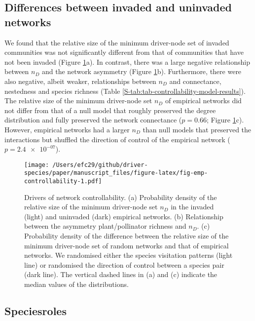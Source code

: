\documentclass[a4paper]{artikel1}
\theoremstyle{definition}
\theoremstyle{definition}
\theoremstyle{definition}
\theoremstyle{remark}
\providecommand{\DIFaddtex}[1]{{\protect\color{blue}\uwave{#1}}} %
\providecommand{\DIFaddbegin}{} %
\providecommand{\DIFaddend}{} %
\providecommand{\DIFadd}[1]{\texorpdfstring{\DIFaddtex{#1}}{#1}} %
\begin{document}
\subsection{Differences between invaded and uninvaded
networks}\label{differences-between-invaded-and-uninvaded-networks-1}

We found that the relative size of the minimum driver-node set of
invaded communities was not significantly different from that of
communities that have not been invaded (Figure
\ref{fig:fig-emp-controllability}a). In contrast, there was a large
negative relationship between \(n_D\) and the network asymmetry (Figure
\ref{fig:fig-emp-controllability}b). Furthermore, there were also
negative, albeit weaker, relationships between \(n_D\) and connectance,
nestedness and species richness (Table
\ref{S-tab:tab-controllability-model-results}). The relative size of the
minimum driver-node set \(n_D\) of empirical networks did not differ
from that of a null model that roughly preserved the degree distribution
and fully preserved the network connectance (\(p = \num{0.66}\); Figure
\ref{fig:fig-emp-controllability}c). However, empirical networks had a
larger \(n_D\) than null models that preserved the interactions but
shuffled the direction of control of the empirical network
(\(p = \num{2.4e-07}\)).

\begin{figure}
\centering
\texttt{[image: /Users/efc29/github/driver-species/paper/manuscript\_files/figure-latex/fig-emp-controllability-1.pdf]}
\caption{\label{fig:fig-emp-controllability}Drivers of network
controllability. (a) Probability density of the relative size of the
minimum driver-node set \(n_D\) in the invaded (light) and uninvaded
(dark) empirical networks. (b) Relationship between the asymmetry
plant/pollinator richness and \(n_D\). (c) Probability density of the
difference between the relative size of the minimum driver-node set of
random networks and that of empirical networks. We randomised either the
species visitation patterns (light line) or randomised the direction of
control between a species pair (dark line). The vertical dashed lines in
(a) and (c) indicate the median values of the distributions.}
\end{figure}

\subsection{Species\DIFaddbegin \DIFadd{' }\DIFaddend roles}\label{species-roles-1}
\end{document}
